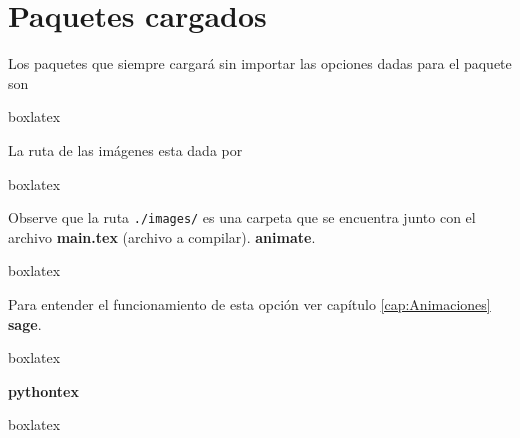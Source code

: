 {	\section{Paquetes cargados}
		Los paquetes que siempre cargará sin importar las opciones dadas para el paquete son
		\begin{tcblisting}{boxlatex}
			\RequirePackage{import, amsmath, amsfonts, amssymb, amsthm}%
			\RequirePackage{yfonts, lmodern}%
			\RequirePackage{ragged2e}%
			\RequirePackage{forloop}
			\RequirePackage{calc} %
			\RequirePackage{shellesc} %
			\RequirePackage{ifplatform} %
			\RequirePackage{tikz}
			\usetikzlibrary{shadows.blur, shapes.symbols, babel, tikzmark}
			\RequirePackage{tikz-cd}
			\RequirePackage{wrapfig} %
			\RequirePackage{float} %
			\RequirePackage{graphics, graphicx, svg} %
			\RequirePackage{tcolorbox}
			\RequirePackage{array, tabularx, colortbl}%
			\RequirePackage{geometry}
			\RequirePackage{hyperref}
			\RequirePackage{pgfopts}
			\RequirePackage{\pathroot lib/designAcademycosCommands}
			\RequirePackage{\pathroot lib/tcb/stylesTCB}
		\end{tcblisting}
        La ruta de las imágenes esta dada por 
		\begin{tcblisting}{boxlatex}
			\graphicspath{{./images/}}
		\end{tcblisting}
		Observe que la ruta \verb|./images/| es una carpeta que se encuentra junto con el archivo \textbf{main.tex} (archivo a compilar).\pap
		\textbf{animate}.
		\begin{tcblisting}{boxlatex}
			\ifanimation
			\RequirePackage{animate}%
				\newcommand{\panimate}[2]{#2}
			\else 
				\newcommand{\panimate}[2]{#1}
			\fi
		\end{tcblisting}
		Para entender el funcionamiento de esta opción ver capítulo \ref{cap:Animaciones}\pap	
		\textbf{sage}.
		\begin{tcblisting}{boxlatex}
			\ifsage
				\RequirePackage{\sagepathroot\sagenameversion}
				\ifsagecommands
					\RequirePackage{\sagepathroot sageCommands}
				\fi
			\fi
		\end{tcblisting}
		\textbf{pythontex}
		\begin{tcblisting}{boxlatex}
			\ifpythontex
				\RequirePackage{pythontex}
			\fi
		\end{tcblisting}
}
